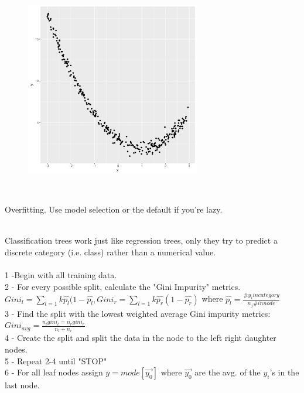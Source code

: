 \documentclass[12pt]{article}
\begin{document}
\begin{enumerate}
{\begin{figure}[htp]
\centering
\includegraphics[width=3in]{curvy}
\end{figure}

}~


Overfitting.
Use model selection or the default if you're lazy.

\end{enumerate}




\begin{enumerate}

\\
Classification trees work just like regression trees, only they try to predict a discrete category (i.e. class) rather than a numerical value.\\
\\
1 -Begin with all training data. \\ 
2 - For every possible split, calculate the "Gini Impurity" metrics. $Gini_l = \sum\limits_{l =1}{k} \hat{p_l} (1-\hat{p_l} , Gini_r = \sum\limits_{l=1}{k} \hat{p_r} (1-\hat{p_r})$ where $\hat{p_l} = \frac{\#y_i in category}{n_j \# in node}$\\
3 - Find the split with the lowest weighted average Gini impurity metrics: $Gini_{avg} = \frac{n_l gini_l = n_r gini_r}{n_l + n_r}$\\ 4 - Create the split and split the data in the node to the left right daughter nodes. \\ 5 - Repeat 2-4 until "STOP" \\ 6 - For all leaf nodes assign $\bar{y} = mode[\vec{y_0}]$ where $\vec{y_0}$ are the avg. of the $y_{i}$'s in the last node.
\\

\end{enumerate}
\end{document}
